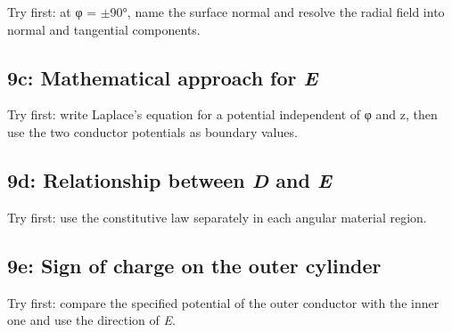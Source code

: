 \documentclass[11pt]{article}
\begin{document}
\begin{keepsection}
\begin{keepsection}
Try first: at φ = \ensuremath{\pm}90°, name the surface normal and resolve the radial field into normal and tangential components.

\end{keepsection}

\begin{keepsection}
\subsection{9c: Mathematical approach for \textit{E}}

Try first: write Laplace’s equation for a potential independent of φ and z, then use the two conductor potentials as boundary values.

\end{keepsection}

\begin{keepsection}
\subsection{9d: Relationship between \textit{D} and \textit{E}}

Try first: use the constitutive law separately in each angular material region.

\end{keepsection}

\begin{keepsection}
\subsection{9e: Sign of charge on the outer cylinder}

Try first: compare the specified potential of the outer conductor with the inner one and use the direction of \textit{E}.

\end{keepsection}

\begin{keepsection}

\end{keepsection}
\end{keepsection}
\end{document}
